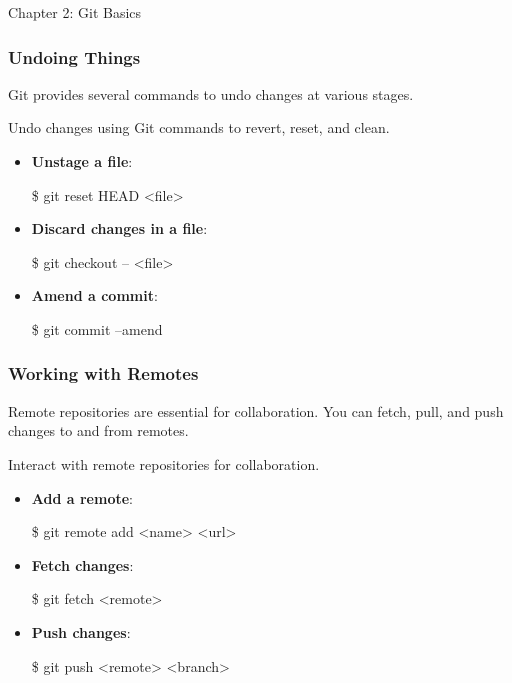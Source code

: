\begin{notes}{Chapter 2: Git Basics}
\begin{highlight}
    \end{highlight}
    
    \subsubsection*{Undoing Things}
    
    Git provides several commands to undo changes at various stages.
    
    \begin{highlight}
    
        Undo changes using Git commands to revert, reset, and clean.
        
        \begin{itemize}
            \item \textbf{Unstage a file}:
    \begin{code}[Bash]
    \$ git reset HEAD <file>
    \end{code}
            \item \textbf{Discard changes in a file}:
    \begin{code}[Bash]
    \$ git checkout -- <file>
    \end{code}
            \item \textbf{Amend a commit}:
    \begin{code}[Bash]
    \$ git commit --amend
    \end{code}
        \end{itemize}
    
    \end{highlight}
    
    \subsubsection*{Working with Remotes}
    
    Remote repositories are essential for collaboration. You can fetch, pull, and push changes to and from remotes.
    
    \begin{highlight}
    
        Interact with remote repositories for collaboration.
        
        \begin{itemize}
            \item \textbf{Add a remote}:
    \begin{code}[Bash]
    \$ git remote add <name> <url>
    \end{code}
            \item \textbf{Fetch changes}:
    \begin{code}[Bash]
    \$ git fetch <remote>
    \end{code}
            \item \textbf{Push changes}:
    \begin{code}[Bash]
    \$ git push <remote> <branch>
    \end{code}
        \end{itemize}
    

\end{highlight}
\end{notes}
